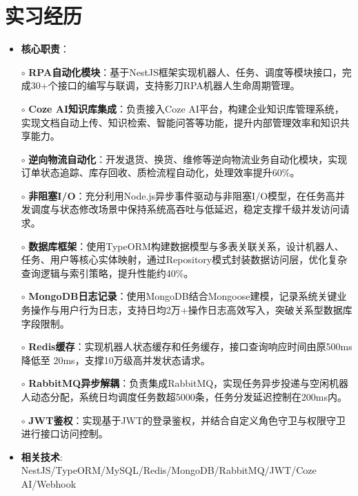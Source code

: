 \section{实习经历}
    \begin{normalsize}
      \begin{itemize}
        \item \textbf{核心职责}：
        \setlength{\itemindent}{1em} %
          \item[$\circ$] \textbf{RPA自动化模块}：基于NestJS框架实现机器人、任务、调度等模块接口，完成30+个接口的编写与联调，支持影刀RPA机器人生命周期管理。
          \item[$\circ$] \textbf{Coze AI知识库集成}：负责接入Coze AI平台，构建企业知识库管理系统，实现文档自动上传、知识检索、智能问答等功能，提升内部管理效率和知识共享能力。
          \item[$\circ$] \textbf{逆向物流自动化}：开发退货、换货、维修等逆向物流业务自动化模块，实现订单状态追踪、库存回收、质检流程自动化，处理效率提升60\%。
          \item[$\circ$] \textbf{非阻塞I/O}：充分利用Node.js异步事件驱动与非阻塞I/O模型，在任务高并发调度与状态修改场景中保持系统高吞吐与低延迟，稳定支撑千级并发访问请求。
          \item[$\circ$] \textbf{数据库框架}：使用TypeORM构建数据模型与多表关联关系，设计机器人、任务、用户等核心实体映射，通过Repository模式封装数据访问层，优化复杂查询逻辑与索引策略，提升性能约40\%。
          \item[$\circ$] \textbf{MongoDB日志记录}：使用MongoDB结合Mongoose建模，记录系统关键业务操作与用户行为日志，支持日均2万+操作日志高效写入，突破关系型数据库字段限制。
          \item[$\circ$] \textbf{Redis缓存}：实现机器人状态缓存和任务缓存，接口查询响应时间由原500ms降低至 20ms，支撑10万级高并发状态请求。
          \item[$\circ$] \textbf{RabbitMQ异步解耦​​}：负责集成RabbitMQ，实现任务异步投递与空闲机器人动态分配，系统日均调度任务数超5000条，任务分发延迟控制在200ms内。
          \item[$\circ$] \textbf{JWT鉴权}：实现基于JWT的登录鉴权，并结合自定义角色守卫与权限守卫进行接口访问控制。
        \setlength{\itemindent}{0em} %
        \item \textbf{相关技术}: NestJS/TypeORM/MySQL/Redis/MongoDB/RabbitMQ/JWT/Coze AI/Webhook
        \end{itemize}
    \end{normalsize}